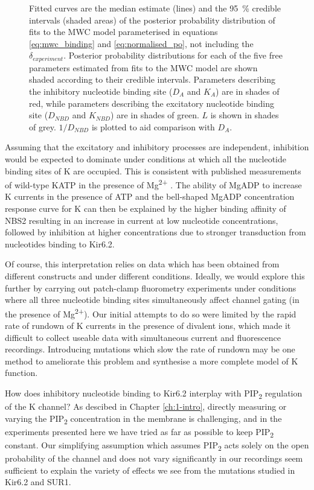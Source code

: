 \begin{figure}[hbtp]
{	Fitted curves are the median estimate (lines) and the \SI{95}{\percent} credible intervals (shaded areas) of the posterior probability distribution of fits to the MWC model parameterised in equations \ref{eq:mwc_binding} and \ref{eq:normalised_po}, not including the $\delta_{experiment}$.
	 Posterior probability distributions for each of the five free parameters estimated from fits to the MWC model are shown shaded according to their credible intervals.
	Parameters describing the inhibitory nucleotide binding site ($D_A$ and $K_A$) are in shades of red, while parameters describing the excitatory nucleotide binding site ($D_{NBD}$ and $K_{NBD}$) are in shades of green.
	$L$ is shown in shades of grey.
	$1/D_{NBD}$ is plotted to aid comparison with $D_A$.
	}\label{ch7fig:activation_fits}
\end{figure}

Assuming that the excitatory and inhibitory processes are independent, inhibition would be expected to dominate under conditions at which all the nucleotide binding sites of K\ATP{} are occupied.
This is consistent with published measurements of wild-type KATP in the presence of Mg\textsuperscript{2+} \cite{proks_activation_2010}.
The ability of MgADP to increase K\ATP{} currents in the presence of ATP \cite{gribble_mgatp_1998-1} and the bell-shaped MgADP concentration response curve for K\ATP{} \cite{proks_activation_2010, vedovato_nucleotide-binding_2015} can then be explained by the higher binding affinity of NBS2 resulting in an increase in current at low nucleotide concentrations, followed by inhibition at higher concentrations due to stronger transduction from nucleotides binding to Kir6.2.

Of course, this interpretation relies on data which has been obtained from different constructs and under different conditions.
Ideally, we would explore this further by carrying out patch-clamp fluorometry experiments under conditions where all three nucleotide binding sites simultaneously affect channel gating (in the presence of Mg\textsuperscript{2+}).
Our initial attempts to do so were limited by the rapid rate of rundown of K\ATP{} currents in the presence of divalent ions, which made it difficult to collect useable data with simultaneous current and fluorescence recordings.
Introducing mutations which slow the rate of rundown may be one method to ameliorate this problem and synthesise a more complete model of K\ATP{} function.

How does inhibitory nucleotide binding to Kir6.2 interplay with PIP\textsubscript{2} regulation of the K\ATP{} channel?
As descibed in Chapter \ref{ch:1-intro}, directly measuring or varying the PIP\textsubscript{2} concentration in the membrane is challenging, and in the experiments presented here we have tried as far as possible to keep PIP\textsubscript{2} constant.
Our simplifying assumption which assumes PIP\textsubscript{2} acts solely on the open probability of the channel and does not vary significantly in our recordings seem sufficient to explain the variety of effects we see from the mutations studied in Kir6.2 and SUR1.

